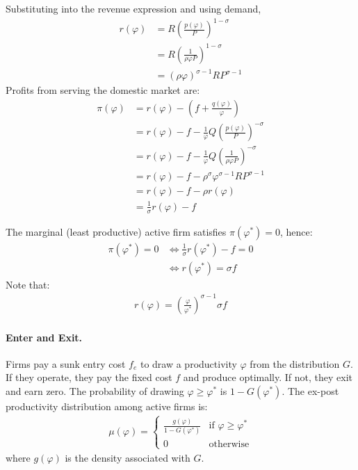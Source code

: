 \begin{solution}
    Substituting into the revenue expression and using demand,
    \begin{align*}
        r(\varphi) &= R \left( \frac{p(\varphi)}{P} \right)^{1 - \sigma} \\
        &= R \left( \frac{1}{\rho \varphi P} \right)^{1 - \sigma} \\
        &= (\rho \varphi)^{\sigma - 1} R P^{\sigma - 1}
    \end{align*} 
    Profits from serving the domestic market are: 
    \begin{align*}
        \pi(\varphi) &= r(\varphi) - \left( f + \frac{q(\varphi)}{\varphi} \right) \\
        &= r(\varphi) - f - \frac{1}{\varphi} Q \left( \frac{p(\varphi)}{P} \right)^{-\sigma} \\
        &= r(\varphi) - f - \frac{1}{\varphi} Q \left( \frac{1}{\rho\varphi P} \right)^{-\sigma} \\
        &= r(\varphi) - f -  \rho^{\sigma} \varphi^{\sigma - 1} R P^{\sigma - 1} \\
        &= r(\varphi) - f -  \rho r(\varphi) \\
        &= \frac{1}{\sigma} r(\varphi) - f
    \end{align*}
    
    The marginal (least productive) active firm satisfies $\pi(\varphi^*)=0$, hence:
    \begin{align*}
        \pi(\varphi^*) = 0 &\iff \frac{1}{\sigma} r(\varphi^*) - f = 0 \\
        &\iff r(\varphi^*) = \sigma f 
    \end{align*}
    Note that:
    \begin{align*}
        r(\varphi) = \left(\frac{\varphi}{\varphi^*}\right)^{\sigma - 1} \sigma f
    \end{align*}

    \paragraph{Enter and Exit.} Firms pay a sunk entry cost $f_e$ to draw a productivity $\varphi$ from the distribution $G$. If they operate, they pay the fixed cost $f$ and produce optimally. If not, they exit and earn zero. The probability of drawing $\varphi \ge \varphi^*$ is $1 - G(\varphi^*)$. The ex-post productivity distribution among active firms is:
    \begin{align*}
        \mu(\varphi) = \begin{cases}
            \frac{g(\varphi)}{1 - G(\varphi^*)} & \text{if } \varphi \geq \varphi^*\\
            0 & \text{otherwise}
        \end{cases}
    \end{align*}
    where $g(\varphi)$ is the density associated with $G$.


\end{solution}
